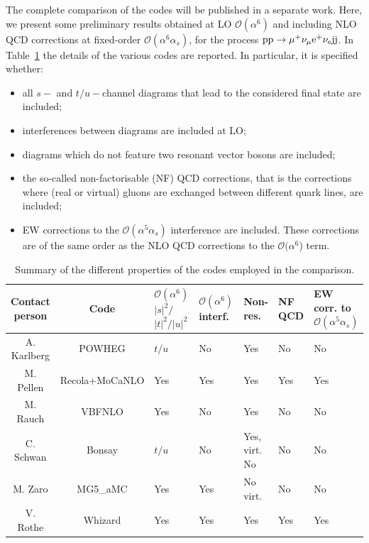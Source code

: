 The complete comparison of the codes will be published in a separate work. Here, we present some preliminary results obtained at LO $\mathcal O (\alpha^6)$ and including
NLO QCD corrections at fixed-order $\mathcal O (\alpha^6\alpha_s)$, for the process ${\rm p}{\rm p}\to\mu^+\nu_\mu{\rm e}^+\nu_{\rm e}{\rm j}{\rm j}$.
In Table~\ref{tab:wg1_codes} the details of the various codes are reported. In particular, it is specified whether:
\begin{itemize}
    \item all $s-$ and $t/u-$channel diagrams that lead to the considered final state are included;
    \item interferences between diagrams are included at LO;
    \item diagrams which do not feature two resonant vector bosons are included;
    \item the so-called non-factorisable (NF) QCD corrections, that is the corrections where (real or virtual) gluons are exchanged between different quark lines,
        are included;
    \item EW corrections to the $\mathcal O (\alpha^5\alpha_s)$ interference are included. These corrections are of the same order as the NLO QCD corrections to
        the  $\mathcal O (\alpha^6$) term.
\end{itemize}
%
\begin{table}
    \footnotesize
    \begin{tabularx}{\textwidth}{c|c|X|X|X|X|X}
        Contact person  &  Code  &  $\mathcal O(\alpha^6)$ $|s|^2/$ $|t|^2/|u|^2$  &  $\mathcal O(\alpha^6)$ interf.  &  Non-res.  &  NF QCD  &  EW corr. to $\mathcal O(\alpha^5\alpha_s)$  \\
        \hline
        \hline
        A. Karlberg  &  {\sc POWHEG}  &  $t/u$  &  No  &  Yes  &  No  &  No  \\
        M. Pellen    &  {\sc Recola+MoCaNLO}  &  Yes  &  Yes  &  Yes  &  Yes  &  Yes  \\
        M. Rauch     &  {\sc VBFNLO}  &  Yes  &  No  &  Yes  &  No  &  No  \\
        C. Schwan    &  {\sc Bonsay}  &  $t/u$  &  No  &  Yes, virt. No  &  No  &  No  \\
        M. Zaro      &  {\sc MG5\_aMC}  &  Yes  &  Yes  &  No virt.  &  No  &  No \\
        V. Rothe     &  {\sc Whizard}  &  Yes  &  Yes  &  Yes  &  Yes  &  Yes \\  
    \end{tabularx}
    \caption{\label{tab:wg1_codes} Summary of the different properties of the codes employed in the comparison.}
\end{table}
%

